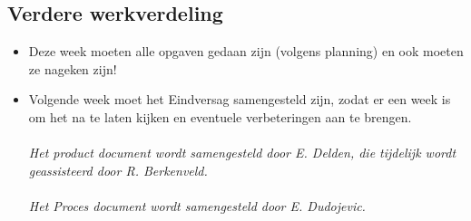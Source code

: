 \documentclass[11pt]{article}
\begin{document}
\subsection{Verdere werkverdeling}

\begin{itemize}

\item Deze week moeten alle opgaven gedaan zijn (volgens planning)
en ook moeten ze nageken zijn!
\\
\item Volgende week moet het Eindversag samengesteld zijn, zodat
er een week is om het na te laten kijken en eventuele verbeteringen
aan te brengen.
\\\\
\emph{Het product document wordt samengesteld door E. Delden, die
tijdelijk wordt geassisteerd door R. Berkenveld.}
\\\\
\emph{Het Proces
document wordt samengesteld door E. Dudojevic.}

\end{itemize}
\end{document}
